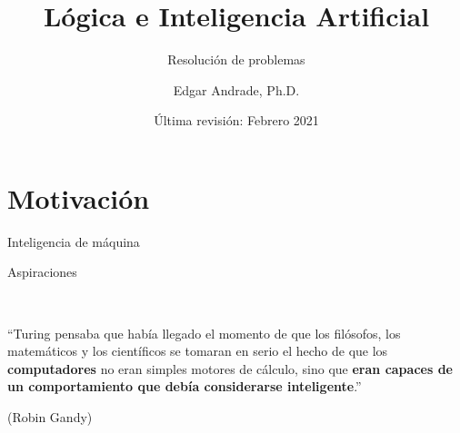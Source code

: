 \documentclass[11pt]{beamer}
\author{Edgar Andrade, Ph.D.}
\title{Lógica e Inteligencia Artificial}
\subtitle{Resolución de problemas}
\institute{Matemáticas Aplicadas y Ciencias de la computación}
\date{Última revisión: Febrero 2021}
\begin{document}
\begin{frame}
\titlepage
\end{frame}

\begin{frame}
\tableofcontents
\end{frame}


\section{Motivación}

\begin{frame}{Inteligencia de máquina}

\begin{block}{Aspiraciones}

\

``Turing pensaba que había llegado el momento de que los filósofos, los matemáticos y los científicos se tomaran en serio el hecho de que los \textbf{computadores} no eran simples motores de cálculo, sino que \textbf{eran capaces de un comportamiento que debía considerarse inteligente}.'' 

\begin{flushright}
(Robin Gandy)
\end{flushright}
\end{block}

\end{frame}
\end{document}
